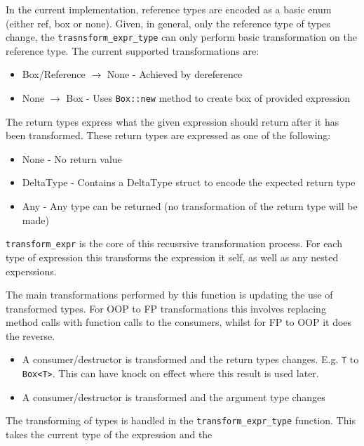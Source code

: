 \documentclass[ oneside,%
                    author={James Elgar},
                    degree={MEng},
                     title={Bidirectional transformer between functional and \\ object-oriented programming in Rust},
                  subtitle={}]{dissertation}
\newcommand{\rust}[1]{\texttt{#1}}
\begin{document}
In the current implementation, reference types are encoded as a basic enum (either ref, box or none). Given, in general, only the reference type of types change, the \verb|trasnsform_expr_type| can only perform basic transformation on the reference type. The current supported transformations are:

\begin{itemize}
    \item Box/Reference $\xrightarrow{}$ None - Achieved by dereference
    \item None $\xrightarrow{}$ Box - Uses \rust{Box::new} method to create box of provided expression
\end{itemize}

The return types express what the given expression should return after it has been transformed. These return types are expressed as one of the following:

\begin{itemize}
    \item None - No return value
    \item DeltaType - Contains a DeltaType struct to encode the expected return type
    \item Any - Any type can be returned (no transformation of the return type will be made)
\end{itemize}



\verb|transform_expr| is the core of this recusrsive transformation process. For each type of expression this transforms the expression it self, as well as any nested experssions.

The main transformations performed by this function is updating the use of transformed types. For OOP to FP transformations this involves replacing method calls with function calls to the consumers, whilst for FP to OOP it does the reverse. 

\begin{itemize}
    \item A consumer/destructor is transformed and the return types changes. E.g. \verb|T| to \verb|Box<T>|. This can have knock on effect where this result is used later.
    \item A consumer/destructor is transformed and the argument type changes
\end{itemize}

The transforming of types is handled in the \verb|transform_expr_type| function. This takes the current type of the expression and the 
\end{document}
